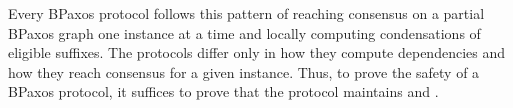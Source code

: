 Every BPaxos protocol follows this pattern of reaching consensus on a partial
BPaxos graph one instance at a time and locally computing condensations of
eligible suffixes. The protocols differ only in how they compute dependencies
and how they reach consensus for a given instance. Thus, to prove the
safety of a BPaxos protocol, it suffices to prove that the protocol maintains
 and .
